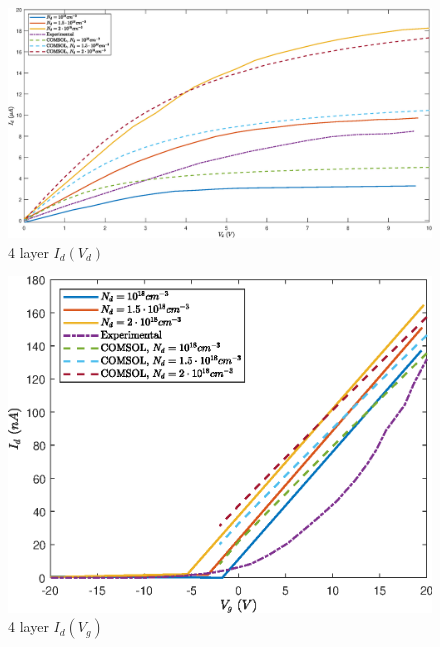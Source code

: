 \documentclass[electronics,article,submit,moreauthors,pdftex]{Definitions/mdpi}
\begin{document}
\begin{figure}[H]
	\centering
	\includegraphics[width=1\textwidth]{Grafici/4layer_Id(Vd).eps} 
	\caption{4 layer $I_d(V_d)$}
	\label{fig:4layer_Id(Vd)}
\end{figure}

\begin{figure}[H]
	\centering
	\includegraphics[width=.8\textwidth]{Grafici/4layer_Id(Vg).eps} 
	\caption{4 layer $I_d(V_g)$}
	\label{fig:4layer_Id(Vg)}
\end{figure}
\end{document}
